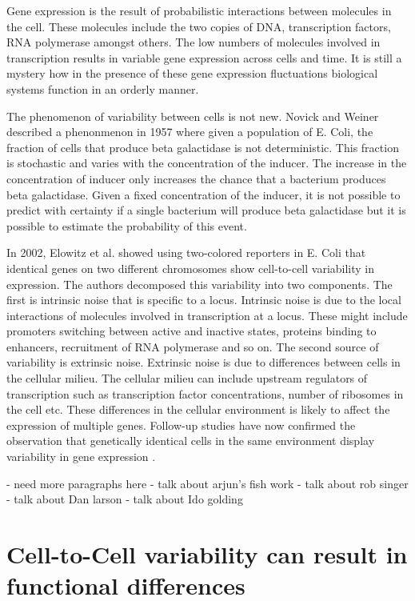 Gene expression is the result of probabilistic interactions between molecules in the cell. These molecules include the two copies of DNA, transcription factors, RNA polymerase amongst others. The low numbers of molecules involved in transcription results in  variable gene expression across cells and time. It is still a mystery how in the presence of these gene expression fluctuations biological systems function in an orderly manner.

The phenomenon of variability between cells is not new. Novick and Weiner \cite{novick_enzyme_1957} \cite{raj_nature_2008} described a phenonmenon in 1957 where given a population of E. Coli, the fraction of cells that produce beta galactidase is not deterministic. This fraction is stochastic and varies with the concentration of the inducer. The increase in the concentration of inducer only increases the chance that a bacterium produces beta galactidase. Given a fixed concentration of the inducer, it is not possible to predict with certainty if a single bacterium will produce beta galactidase but it is possible to estimate the probability of this event.

In 2002, Elowitz et al.  \cite{elowitz_stochastic_2002} showed using two-colored reporters in E. Coli that identical genes on two different chromosomes show cell-to-cell variability in expression. The authors decomposed this variability into two components. The first is intrinsic noise that is specific to a locus. Intrinsic noise is due to the local interactions of molecules involved in transcription at a locus. These might include promoters switching between active and inactive states, proteins binding to enhancers, recruitment of RNA polymerase and so on. The second source of variability is extrinsic noise. Extrinsic noise is due to differences between cells in the cellular milieu. The cellular milieu can include upstream regulators of transcription such as transcription factor concentrations, number of ribosomes in the cell etc. These differences in the cellular environment is likely to affect the expression of multiple genes. Follow-up studies have now confirmed the observation that genetically identical cells in the same environment display variability in gene expression \cite{raser_control_2004,blake_phenotypic_2006,blake_noise_2003,raser_noise_2005,volfson_origins_2006}.

- need more paragraphs here
- talk about arjun's fish work
- talk about rob singer
- talk about Dan larson
- talk about Ido golding


\section{Cell-to-Cell variability can result in functional differences}

